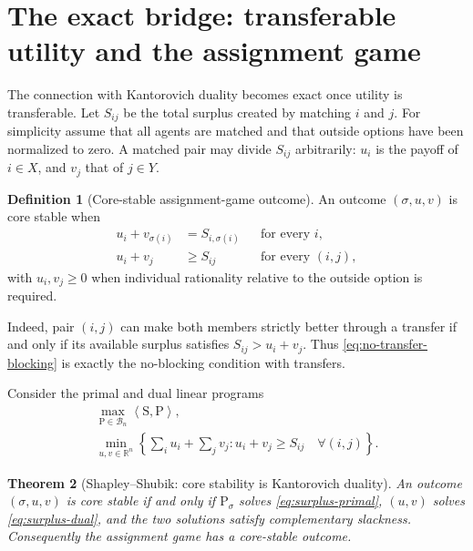 \documentclass[11pt]{article}
\newtheorem{theorem}{Theorem}[section]
\theoremstyle{definition}
\newtheorem{definition}[theorem]{Definition}
\theoremstyle{remark}
\newcommand{\R}{\mathbb R}
\newcommand{\Pmat}{\mathrm P}
\newcommand{\Smat}{\mathrm S}
\newcommand{\Bcal}{\mathcal B}
\newcommand{\ip}[2]{\left\langle #1,#2\right\rangle}
\begin{document}
\section{The exact bridge: transferable utility and the assignment game}
\label{sec:assignment-game}

The connection with Kantorovich duality becomes exact once utility is
transferable. Let \(S_{ij}\) be the total surplus created by matching \(i\) and
\(j\). For simplicity assume that all agents are matched and that outside
options have been normalized to zero. A matched pair may divide \(S_{ij}\)
arbitrarily: \(u_i\) is the payoff of \(i\in X\), and \(v_j\) that of \(j\in Y\).

\begin{definition}[Core-stable assignment-game outcome]
An outcome \((\sigma,u,v)\) is core stable when
\begin{align}
  u_i+v_{\sigma(i)}&=S_{i,\sigma(i)} &&\text{for every }i,
  \label{eq:budget-balance}\\
  u_i+v_j&\geq S_{ij} &&\text{for every }(i,j),
  \label{eq:no-transfer-blocking}
\end{align}
with \(u_i,v_j\geq0\) when individual rationality relative to the outside
option is required.
\end{definition}

Indeed, pair \((i,j)\) can make both members strictly better through a transfer
if and only if its available surplus satisfies \(S_{ij}>u_i+v_j\). Thus
\eqref{eq:no-transfer-blocking} is exactly the no-blocking condition with
transfers.

Consider the primal and dual linear programs
\begin{align}
  \max_{\Pmat\in\Bcal_n}\ip{\Smat}{\Pmat},
  \label{eq:surplus-primal}\\
  \min_{u,v\in\R^n}
  \left\{\sum_i u_i+\sum_jv_j:
  u_i+v_j\geq S_{ij}\quad\forall(i,j)\right\}.
  \label{eq:surplus-dual}
\end{align}

\begin{theorem}[Shapley--Shubik: core stability is Kantorovich duality]
\label{thm:assignment-game}
An outcome \((\sigma,u,v)\) is core stable if and only if
\(\Pmat_\sigma\) solves \eqref{eq:surplus-primal}, \((u,v)\) solves
\eqref{eq:surplus-dual}, and the two solutions satisfy complementary slackness.
Consequently the assignment game has a core-stable outcome.
\end{theorem}
\end{document}
